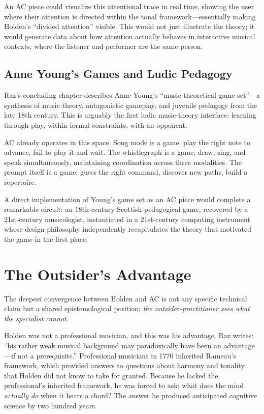 \documentclass[10pt,letterpaper,twocolumn]{article}
\begin{document}
An AC piece could visualize this attentional trace in real time, showing the user where their attention is directed within the tonal framework---essentially making Holden's ``divided attention'' visible. This would not just illustrate the theory; it would generate data about how attention actually behaves in interactive musical contexts, where the listener and performer are the same person.

\subsection{Anne Young's Games and Ludic Pedagogy}

Raz's concluding chapter describes Anne Young's ``music-theoretical game set''---a synthesis of music theory, antagonistic gameplay, and juvenile pedagogy from the late 18th century. This is arguably the first ludic music-theory interface: learning through play, within formal constraints, with an opponent.

AC already operates in this space. Song mode is a game: play the right note to advance, fail to play it and wait. The whistlegraph is a game: draw, sing, and speak simultaneously, maintaining coordination across three modalities. The prompt itself is a game: guess the right command, discover new paths, build a repertoire.

A direct implementation of Young's game set as an AC piece would complete a remarkable circuit: an 18th-century Scottish pedagogical game, recovered by a 21st-century musicologist, instantiated in a 21st-century computing instrument whose design philosophy independently recapitulates the theory that motivated the game in the first place.

\section{The Outsider's Advantage}
\label{sec:outsider}

The deepest convergence between Holden and AC is not any specific technical claim but a shared epistemological position: \emph{the outsider-practitioner sees what the specialist cannot}.

Holden was not a professional musician, and this was his advantage. Raz writes: ``his rather weak musical background may paradoxically have been an advantage---if not a prerequisite.'' Professional musicians in 1770 inherited Rameau's framework, which provided answers to questions about harmony and tonality that Holden did not know to take for granted. Because he lacked the professional's inherited framework, he was forced to ask: what does the mind \emph{actually do} when it hears a chord? The answer he produced anticipated cognitive science by two hundred years.
\end{document}
